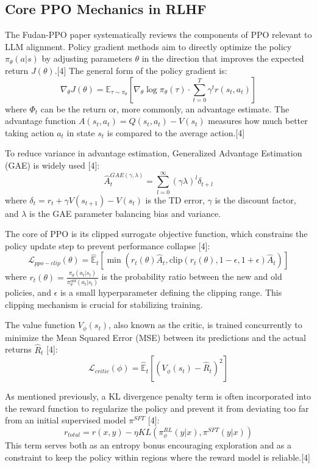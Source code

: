 \documentclass[10pt,journal,compsoc]{IEEEtran} %
\begin{document}
\subsection{Core PPO Mechanics in RLHF}
The Fudan-PPO paper systematically reviews the components of PPO relevant to LLM alignment.
Policy gradient methods aim to directly optimize the policy $\pi_\theta(a|s)$ by adjusting parameters $\theta$ in the direction that improves the expected return $J(\theta)$.[4] The general form of the policy gradient is:
$$ \nabla_\theta J(\theta) = \mathbb{E}_{\tau \sim \pi_\theta} \left[ \nabla_\theta \log \pi_\theta(\tau) \cdot \sum_{t=0}^{T} \gamma^t r(s_t, a_t) \right] $$
where $\Phi_t$ can be the return or, more commonly, an advantage estimate. The advantage function $A(s_t, a_t) = Q(s_t, a_t) - V(s_t)$ measures how much better taking action $a_t$ in state $s_t$ is compared to the average action.[4]

To reduce variance in advantage estimation, Generalized Advantage Estimation (GAE) is widely used [4]:
$$ \hat{A}_t^{GAE(\gamma,\lambda)} = \sum_{l=0}^{\infty} (\gamma\lambda)^l \delta_{t+l} $$
where $\delta_t = r_t + \gamma V(s_{t+1}) - V(s_t)$ is the TD error, $\gamma$ is the discount factor, and $\lambda$ is the GAE parameter balancing bias and variance.

The core of PPO is its clipped surrogate objective function, which constrains the policy update step to prevent performance collapse [4]:
$$ \mathcal{L}_{ppo-clip}(\theta)=\hat{\mathbb{E}}_{t}[\min(r_t(\theta)\hat{A}_{t}, \text{clip}(r_t(\theta),1-\epsilon,1+\epsilon)\hat{A}_{t})] $$
where $r_t(\theta) = \frac{\pi_\theta(a_t|s_t)}{\pi_\theta^{old}(a_t|s_t)}$ is the probability ratio between the new and old policies, and $\epsilon$ is a small hyperparameter defining the clipping range. This clipping mechanism is crucial for stabilizing training.

The value function $V_\phi(s_t)$, also known as the critic, is trained concurrently to minimize the Mean Squared Error (MSE) between its predictions and the actual returns $\hat{R}_t$ [4]:
$$ \mathcal{L}_{critic}(\phi) = \hat{\mathbb{E}}_{t} \left[ (V_\phi(s_t) - \hat{R}_t)^2 \right] $$

As mentioned previously, a KL divergence penalty term is often incorporated into the reward function to regularize the policy and prevent it from deviating too far from an initial supervised model $\pi^{SFT}$ [4]:
$$ r_{total} = r(x,y) - \eta KL(\pi_\phi^{RL}(y|x),\pi^{SFT}(y|x)) $$
This term serves both as an entropy bonus encouraging exploration and as a constraint to keep the policy within regions where the reward model is reliable.[4]
\end{document}
